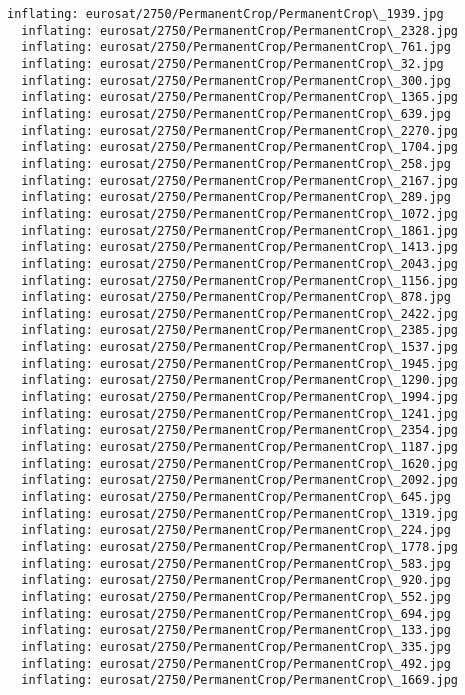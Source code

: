 \documentclass[11pt]{article}
\begin{document}
\begin{Verbatim}[commandchars=\\\{\}]
  inflating: eurosat/2750/PermanentCrop/PermanentCrop\_1939.jpg
  inflating: eurosat/2750/PermanentCrop/PermanentCrop\_2328.jpg
  inflating: eurosat/2750/PermanentCrop/PermanentCrop\_761.jpg
  inflating: eurosat/2750/PermanentCrop/PermanentCrop\_32.jpg
  inflating: eurosat/2750/PermanentCrop/PermanentCrop\_300.jpg
  inflating: eurosat/2750/PermanentCrop/PermanentCrop\_1365.jpg
  inflating: eurosat/2750/PermanentCrop/PermanentCrop\_639.jpg
  inflating: eurosat/2750/PermanentCrop/PermanentCrop\_2270.jpg
  inflating: eurosat/2750/PermanentCrop/PermanentCrop\_1704.jpg
  inflating: eurosat/2750/PermanentCrop/PermanentCrop\_258.jpg
  inflating: eurosat/2750/PermanentCrop/PermanentCrop\_2167.jpg
  inflating: eurosat/2750/PermanentCrop/PermanentCrop\_289.jpg
  inflating: eurosat/2750/PermanentCrop/PermanentCrop\_1072.jpg
  inflating: eurosat/2750/PermanentCrop/PermanentCrop\_1861.jpg
  inflating: eurosat/2750/PermanentCrop/PermanentCrop\_1413.jpg
  inflating: eurosat/2750/PermanentCrop/PermanentCrop\_2043.jpg
  inflating: eurosat/2750/PermanentCrop/PermanentCrop\_1156.jpg
  inflating: eurosat/2750/PermanentCrop/PermanentCrop\_878.jpg
  inflating: eurosat/2750/PermanentCrop/PermanentCrop\_2422.jpg
  inflating: eurosat/2750/PermanentCrop/PermanentCrop\_2385.jpg
  inflating: eurosat/2750/PermanentCrop/PermanentCrop\_1537.jpg
  inflating: eurosat/2750/PermanentCrop/PermanentCrop\_1945.jpg
  inflating: eurosat/2750/PermanentCrop/PermanentCrop\_1290.jpg
  inflating: eurosat/2750/PermanentCrop/PermanentCrop\_1994.jpg
  inflating: eurosat/2750/PermanentCrop/PermanentCrop\_1241.jpg
  inflating: eurosat/2750/PermanentCrop/PermanentCrop\_2354.jpg
  inflating: eurosat/2750/PermanentCrop/PermanentCrop\_1187.jpg
  inflating: eurosat/2750/PermanentCrop/PermanentCrop\_1620.jpg
  inflating: eurosat/2750/PermanentCrop/PermanentCrop\_2092.jpg
  inflating: eurosat/2750/PermanentCrop/PermanentCrop\_645.jpg
  inflating: eurosat/2750/PermanentCrop/PermanentCrop\_1319.jpg
  inflating: eurosat/2750/PermanentCrop/PermanentCrop\_224.jpg
  inflating: eurosat/2750/PermanentCrop/PermanentCrop\_1778.jpg
  inflating: eurosat/2750/PermanentCrop/PermanentCrop\_583.jpg
  inflating: eurosat/2750/PermanentCrop/PermanentCrop\_920.jpg
  inflating: eurosat/2750/PermanentCrop/PermanentCrop\_552.jpg
  inflating: eurosat/2750/PermanentCrop/PermanentCrop\_694.jpg
  inflating: eurosat/2750/PermanentCrop/PermanentCrop\_133.jpg
  inflating: eurosat/2750/PermanentCrop/PermanentCrop\_335.jpg
  inflating: eurosat/2750/PermanentCrop/PermanentCrop\_492.jpg
  inflating: eurosat/2750/PermanentCrop/PermanentCrop\_1669.jpg

\end{Verbatim}
\end{document}
